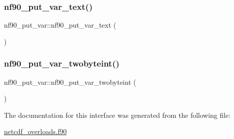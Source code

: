 \subsubsection{\texorpdfstring{nf90\+\_\+put\+\_\+var\+\_\+text()}{nf90\_put\_var\_text()}}
{\footnotesize\ttfamily nf90\+\_\+put\+\_\+var\+::nf90\+\_\+put\+\_\+var\+\_\+text (\begin{DoxyParamCaption}{ }\end{DoxyParamCaption})}

\mbox{\label{interfacenf90__put__var_a1a000a954599635e034347da99fb4af0}} 
\subsubsection{\texorpdfstring{nf90\+\_\+put\+\_\+var\+\_\+twobyteint()}{nf90\_put\_var\_twobyteint()}}
{\footnotesize\ttfamily nf90\+\_\+put\+\_\+var\+::nf90\+\_\+put\+\_\+var\+\_\+twobyteint (\begin{DoxyParamCaption}{ }\end{DoxyParamCaption})}



The documentation for this interface was generated from the following file\+:\begin{DoxyCompactItemize}
\item 
\hyperlink{netcdf__overloads_8f90}{netcdf\+\_\+overloads.\+f90}\end{DoxyCompactItemize}
